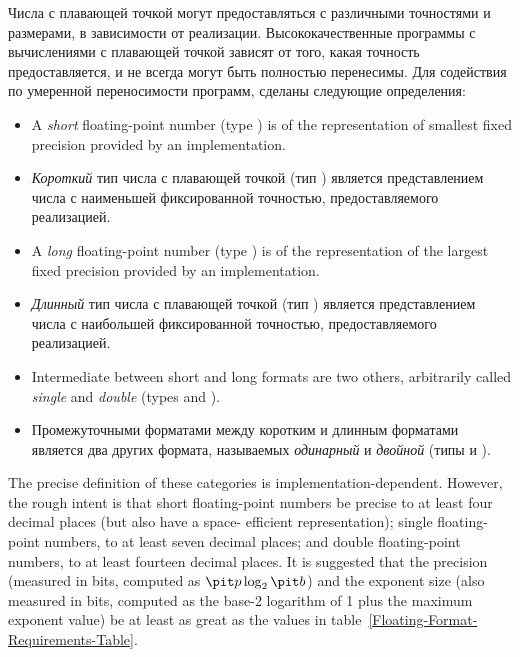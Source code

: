 Числа с плавающей точкой могут предоставляться с различными точностями и
размерами, в зависимости от реализации. Высококачественные программы с
вычислениями с плавающей точкой зависят от того, какая точность предоставляется,
и не всегда могут быть полностью перенесимы. Для содействия по умеренной
переносимости программ, сделаны следующие определения:
\begin{itemize}
\item
A {\it short} floating-point number (type )
is of the representation of smallest
fixed precision provided by an implementation.

\item
{\it Короткий} тип числа с плавающей точкой (тип ) является
представлением числа с наименьшей фиксированной точностью, предоставляемого реализацией.

\item
A {\it long} floating-point number (type )
is of the representation of the largest fixed 
precision provided by an implementation.

\item
{\it Длинный} тип числа с плавающей точкой (тип ) является
представлением числа с наибольшей фиксированной точностью, предоставляемого реализацией.

\item
Intermediate between short and long formats are two others, arbitrarily
called {\it single} and {\it double} (types  and ).

\item
Промежуточными форматами между коротким и длинным форматами является два других
формата, называемых {\it одинарный} и {\it двойной} (типы  и ).
\end{itemize}
The precise definition of these categories is implementation-dependent.
However, the rough intent is that short floating-point numbers be
precise to at least four decimal places (but also have
a space- efficient representation);
single floating-point numbers, to at least seven decimal places;
and double floating-point numbers, to at least fourteen decimal places.
It is suggested that
the precision (measured in bits, computed as ${\it p} \log_2 {\it b}$)
and the exponent size (also measured in bits, computed as the base-2
logarithm of 1 plus the maximum exponent value) be at least as great
as the values in table~\ref{Floating-Format-Requirements-Table}.

